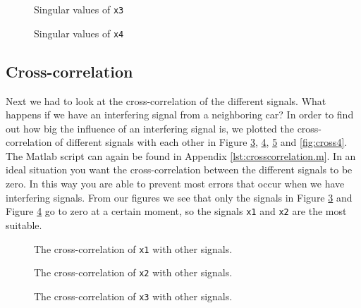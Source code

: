 \documentclass[final]{scrreprt} %
\begin{document}
\begin{figure}[H]
	\centering
    	\setlength\figureheight{6cm}
    	\setlength\figurewidth{10cm}
    	    	
    	\caption{Singular values of \texttt{x3}}
    	\label{fig:error1}
\end{figure}

\begin{figure}[H]
	\centering
    	\setlength\figureheight{6cm}
    	\setlength\figurewidth{10cm}
    	    	
    	\caption{Singular values of \texttt{x4}}
    	\label{fig:error2}
\end{figure}


\subsection{Cross-correlation}
Next we had to look at the cross-correlation of the different signals. 
What happens if we have an interfering signal from a neighboring car?
In order to find out how big the influence of an interfering signal is, we plotted the cross-correlation of different signals with each other in Figure \ref{fig:cross1}, \ref{fig:cross2}, \ref{fig:cross3} and \ref{fig:cross4}.
The Matlab script can again be found in Appendix \ref{lst:crosscorrelation.m}.
In an ideal situation you want the cross-correlation between the different signals to be zero. 
In this way you are able to prevent most errors that occur when we have interfering signals. 
From our figures we see that only the signals in Figure \ref{fig:cross1} and Figure \ref{fig:cross2} go to zero at a certain moment, so the signals \texttt{x1} and \texttt{x2} are the most suitable.



\begin{figure}[H]
	\centering
    	\setlength\figureheight{6cm}
    	\setlength\figurewidth{10cm}
    	    	
    	\caption{The cross-correlation of \texttt{x1} with other signals.}
    	\label{fig:cross1}
\end{figure}

\begin{figure}[H]
	\centering
    	\setlength\figureheight{6cm}
    	\setlength\figurewidth{10cm}
    	    	
    	\caption{The cross-correlation of \texttt{x2} with other signals.}
    	\label{fig:cross2}
\end{figure}

\begin{figure}[H]
	\centering
    	\setlength\figureheight{6cm}
    	\setlength\figurewidth{10cm}
    	    	
    	\caption{The cross-correlation of \texttt{x3} with other signals.}
    	\label{fig:cross3}
\end{figure}
\end{document}
